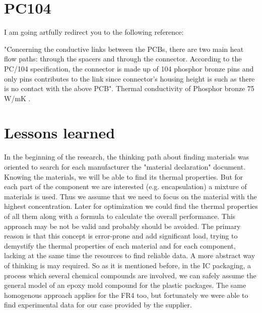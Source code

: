 \documentclass[final]{cubedoc}
\begin{document}
	\section{PC104}
	
	I am going artfully redirect you to the following reference:
	
	"Concerning the conductive links between the PCBs, there are two main heat ﬂow paths: through the spacers and through the connector. According to the PC/104 specification, the connector is made up of 104 phosphor bronze pins and only pins contributes to the link since connector’s housing height is such as there is no contact with the above PCB". Thermal conductivity of Phosphor bronze 75 W/mK \cite[p.104]{jacques2009thermal}. 
	
	
	
	\section{Lessons learned}\label{lessons_learned}
	
	In the beginning of the research, the thinking path about finding materials was oriented to search for each manufacturer the "material declaration" document. Knowing the materials, we will be able to find its thermal properties. But for each part of the component we are interested (e.g. encapsulation) a mixture of materials is used. Thus we assume that we need to focus on the material with the highest concentration. Later for optimization we could find the thermal properties of all them along with a formula to calculate the overall performance. This approach may be not be valid and probably should be avoided. The primary reason is that this concept is error-prone and add significant load, trying to demystify the thermal properties of each material and for each component, lacking at the same time the resources to find reliable data. A more abstract way of thinking is may required. So as it is mentioned before, in the IC packaging, a process which several chemical compounds are involved, we can safely assume the general model of an epoxy mold compound for the plastic packages. The same homogenous approach applies for the FR4 too, but fortunately we were able to find experimental data for our case provided by the supplier.
	
	
\end{document}
